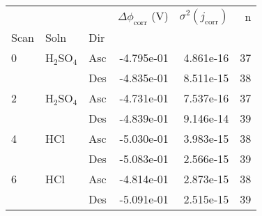 \begin{tabular}{lllrrr}
\toprule
  &     &     &  $\Delta \phi_{\text{corr}}$ (V) &  $\sigma^2(j_{\text{corr}})$ &   n \\
Scan & Soln & Dir &                                  &                              &     \\
\midrule
0 & H$_2$SO$_4$ & Asc &                       -4.795e-01 &                    4.861e-16 &  37 \\
  &     & Des &                       -4.835e-01 &                    8.511e-15 &  38 \\
2 & H$_2$SO$_4$ & Asc &                       -4.731e-01 &                    7.537e-16 &  37 \\
  &     & Des &                       -4.839e-01 &                    9.146e-14 &  39 \\
4 & HCl & Asc &                       -5.030e-01 &                    3.983e-15 &  38 \\
  &     & Des &                       -5.083e-01 &                    2.566e-15 &  39 \\
6 & HCl & Asc &                       -4.814e-01 &                    2.873e-15 &  38 \\
  &     & Des &                       -5.091e-01 &                    2.515e-15 &  39 \\
\bottomrule
\end{tabular}

